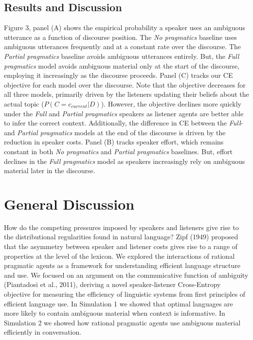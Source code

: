\documentclass[10pt, letterpaper]{article}
\begin{document}
\subsection{Results and Discussion}\label{results-and-discussion-1}

Figure 3, panel (A) shows the empirical probability a speaker uses an
ambiguous utterance as a function of discourse position. The
\textit{No pragmatics} baseline uses ambiguous utterances frequently and
at a constant rate over the discourse. The \textit{Partial pragmatics}
baseline avoids ambiguous utterances entirely. But, the
\textit{Full pragmatics} model avoids ambiguous material only at the
start of the discourse, employing it increasingly as the discourse
proceeds. Panel (C) tracks our CE objective for each model over the
discourse. Note that the objective decreases for all three models,
primarily driven by the listeners updating their beliefs about the
actual topic (\(P(C=c_{current}|D)\)). However, the objective declines
more quickly under the \textit{Full} and \textit{Partial pragmatics}
speakers as listener agents are better able to infer the correct
context. Additionally, the difference in CE between the \textit{Full}-
and \textit{Partial pragmatics} models at the end of the discourse is
driven by the reduction in speaker costs. Panel (B) tracks speaker
effort, which remains constant in both \textit{No pragmatics} and
\textit{Partial pragmatics} baselines. But, effort declines in the
\textit{Full pragmatics} model as speakers increasingly rely on
ambiguous material later in the discourse.\par

\section{General Discussion}\label{general-discussion}

How do the competing pressures imposed by speakers and listeners give
rise to the distributional regularities found in natural language? Zipf
(1949) proposed that the asymmetry between speaker and listener costs
gives rise to a range of properties at the level of the lexicon. We
explored the interactions of rational pragmatic agents as a framework
for understanding efficient language structure and use. We focused on an
argument on the communicative function of ambiguity (Piantadosi et al.,
2011), deriving a novel speaker-listener Cross-Entropy objective for
measuring the efficiency of linguistic systems from first principles of
efficient language use. In Simulation 1 we showed that optimal languages
are more likely to contain ambiguous material when context is
informative. In Simulation 2 we showed how rational pragmatic agents use
ambiguous material efficiently in conversation.\par
\end{document}
